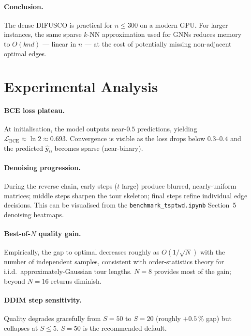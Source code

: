 \documentclass[12pt,a4paper]{article}
\begin{document}
\paragraph{Conclusion.}
The dense DIFUSCO is practical for $n \leq 300$ on a modern GPU.
For larger instances, the same sparse $k$-NN approximation used for GNNs
reduces memory to $O(knd)$ --- linear in $n$ --- at the cost of potentially
missing non-adjacent optimal edges.

\section{Experimental Analysis}

\paragraph{BCE loss plateau.}
At initialisation, the model outputs near-$0.5$ predictions, yielding
$\mathcal{L}_\mathrm{BCE} \approx \ln 2 \approx 0.693$.
Convergence is visible as the loss drops below $0.3$--$0.4$ and the predicted
$\hat{\mathbf{y}}_0$ becomes sparse (near-binary).

\paragraph{Denoising progression.}
During the reverse chain, early steps ($t$ large) produce blurred,
nearly-uniform matrices; middle steps sharpen the tour skeleton;
final steps refine individual edge decisions.
This can be visualised from the \texttt{benchmark\_tsptwd.ipynb} Section~5
denoising heatmaps.

\paragraph{Best-of-$N$ quality gain.}
Empirically, the gap to optimal decreases roughly as $O(1/\sqrt{N})$ with the
number of independent samples, consistent with order-statistics theory for
i.i.d.\ approximately-Gaussian tour lengths.
$N=8$ provides most of the gain; beyond $N=16$ returns diminish.

\paragraph{DDIM step sensitivity.}
Quality degrades gracefully from $S=50$ to $S=20$ (roughly $+0.5\,\%$ gap)
but collapses at $S \leq 5$.
$S=50$ is the recommended default.
\end{document}
